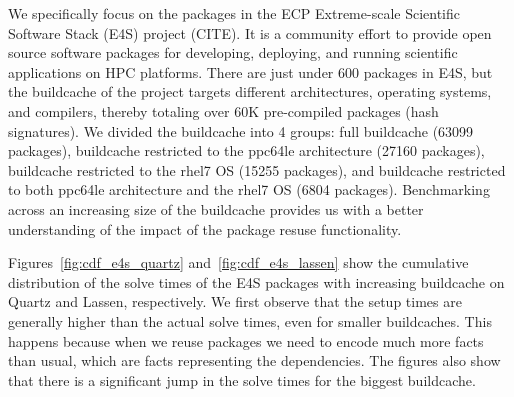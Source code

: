 We specifically focus on the packages in the ECP Extreme-scale Scientific Software Stack (E4S) project (CITE). It is a community effort to provide open source software packages for developing, deploying, and running scientific applications on HPC platforms. There are just under 600 packages in E4S, but the buildcache of the project targets different architectures, operating systems, and compilers, thereby totaling over 60K pre-compiled packages (hash signatures). We divided the buildcache into 4 groups: full buildcache (63099 packages), buildcache restricted to the ppc64le architecture (27160 packages), buildcache restricted to the rhel7 OS (15255 packages), and buildcache restricted to both ppc64le architecture and the rhel7 OS (6804 packages). Benchmarking across an increasing size of the buildcache provides us with a better understanding of the impact of the package resuse functionality.





Figures~\ref{fig:cdf_e4s_quartz} and~\ref{fig:cdf_e4s_lassen} show the cumulative distribution of the solve times of the E4S packages with increasing buildcache on Quartz and Lassen, respectively. We first observe that the setup times are generally higher than the actual solve times, even for smaller buildcaches. This happens because when we reuse packages we need to encode much more facts than usual, which are facts representing the dependencies. The figures also show that there is a significant jump in the solve times for the biggest buildcache.

